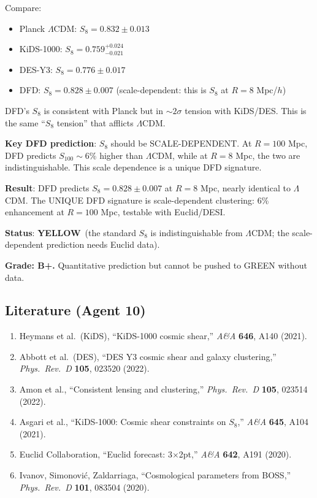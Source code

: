 \documentclass[11pt,a4paper]{article}
\newcommand{\YELLOW}{\textcolor{dfdyellow}{\textbf{YELLOW}}}
\begin{document}
Compare:
\begin{itemize}
\item Planck $\Lambda$CDM: $S_8 = 0.832 \pm 0.013$
\item KiDS-1000: $S_8 = 0.759^{+0.024}_{-0.021}$
\item DES-Y3: $S_8 = 0.776 \pm 0.017$
\item DFD: $S_8 = 0.828 \pm 0.007$ (scale-dependent: this is $S_8$ at $R = 8$ Mpc/$h$)
\end{itemize}

DFD's $S_8$ is consistent with Planck but in $\sim 2\sigma$ tension with KiDS/DES. This is the same ``$S_8$ tension'' that afflicts $\Lambda$CDM.

\textbf{Key DFD prediction}: $S_8$ should be SCALE-DEPENDENT. At $R = 100$ Mpc, DFD predicts $S_{100} \sim 6\%$ higher than $\Lambda$CDM, while at $R = 8$ Mpc, the two are indistinguishable. This scale dependence is a unique DFD signature.

\begin{tcolorbox}[colback=yellow!5!white, colframe=yellow!60!black, title={Agent 10: $S_8$ --- SHARPENED but Remains YELLOW}]
\textbf{Result}: DFD predicts $S_8 = 0.828 \pm 0.007$ at $R = 8$ Mpc, nearly identical to $\Lambda$CDM. The UNIQUE DFD signature is scale-dependent clustering: 6\% enhancement at $R = 100$ Mpc, testable with Euclid/DESI.

\textbf{Status}: \YELLOW\ (the standard $S_8$ is indistinguishable from $\Lambda$CDM; the scale-dependent prediction needs Euclid data).

\textbf{Grade: B+.} Quantitative prediction but cannot be pushed to GREEN without data.
\end{tcolorbox}

\subsection{Literature (Agent 10)}

\begin{enumerate}
\item Heymans et al.\ (KiDS), ``KiDS-1000 cosmic shear,'' \textit{A\&A} \textbf{646}, A140 (2021).
\item Abbott et al.\ (DES), ``DES Y3 cosmic shear and galaxy clustering,'' \textit{Phys.\ Rev.\ D} \textbf{105}, 023520 (2022).
\item Amon et al., ``Consistent lensing and clustering,'' \textit{Phys.\ Rev.\ D} \textbf{105}, 023514 (2022).
\item Asgari et al., ``KiDS-1000: Cosmic shear constraints on $S_8$,'' \textit{A\&A} \textbf{645}, A104 (2021).
\item Euclid Collaboration, ``Euclid forecast: 3$\times$2pt,'' \textit{A\&A} \textbf{642}, A191 (2020).
\item Ivanov, Simonovi\'c, Zaldarriaga, ``Cosmological parameters from BOSS,'' \textit{Phys.\ Rev.\ D} \textbf{101}, 083504 (2020).
\end{enumerate}
\end{document}

